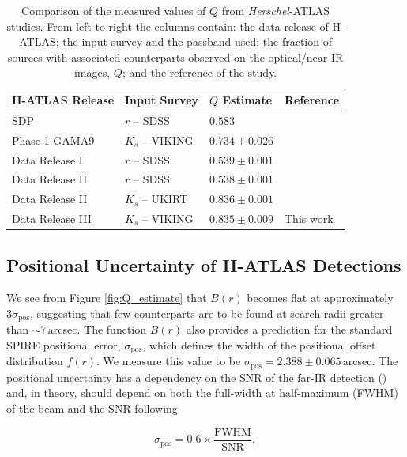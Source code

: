 \begin{table}
\centering
\begin{tabular}{p{3.5cm}|p{3.5cm}|p{2.5cm}|p{3.75cm}}
    \hline
    \hline
    H-ATLAS Release & Input Survey & $Q$ Estimate & Reference \\
    \hline
    \hline
    SDP & $r$ -- SDSS & $0.583$ & \citealt{Smith_2011} \\ 
    Phase 1 GAMA9 & $K_s$ -- VIKING & $0.734\pm0.026$ & \citealt{Fleuren_2012} \\
    Data Release I & $r$ -- SDSS & $0.539\pm0.001$ & \citealt{Bourne_2016} \\
    Data Release II & $r$ -- SDSS & $0.538\pm0.001$ & \citealt{Furlanetto_2018} \\
    Data Release II & $K_s$ -- UKIRT & $0.836\pm0.001$ & \citealt{Furlanetto_2018} \\
    Data Release III & $K_s$ -- VIKING & $0.835\pm0.009$ & This work \\
    \hline
\end{tabular}
\caption[Comparison of optical/near-IR surveys used in H-ATLAS studies]{Comparison of the measured values of $Q$ from \textit{Herschel}-ATLAS studies. From left to right the columns contain: the data release of H-ATLAS; the input survey and the passband used; the fraction of sources with associated counterparts observed on the optical/near-IR images, $Q$; and the reference of the study.}
\label{tab:data_release_input_surveys}
\end{table}

\subsection{Positional Uncertainty of H-ATLAS Detections}

We see from Figure \ref{fig:Q_estimate} that $B(r)$ becomes flat at approximately $3\sigma_{\textrm{pos}}$, suggesting that few counterparts are to be found at search radii greater than $\sim 7\,$arcsec. The function $B(r)$ also provides a prediction for the standard SPIRE positional error, $\sigma_{\textrm{pos}}$, which defines the width of the positional offset distribution $f(r)$. We measure this value to be $\sigma_{\textrm{pos}} = 2.388\pm0.065\,$arcsec. The positional uncertainty has a dependency on the SNR of the far-IR detection (\citealt{Bourne_2016}) and, in theory, should depend on both the full-width at half-maximum (FWHM) of the beam and the SNR following

\begin{equation}
    \sigma_{\textrm{pos}} = 0.6\times\frac{\textrm{FWHM}}{\textrm{SNR}},
\label{eq:positional_uncertainty_theory}
\end{equation}

